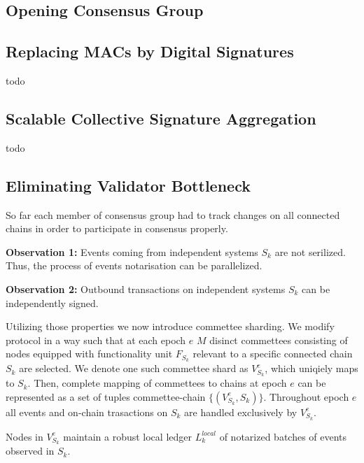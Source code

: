 \subsection{Opening Consensus Group}\label{subsec:opening-consensus-group}


\subsection{Replacing MACs by Digital Signatures}\label{subsec:replacing-macs-by-digital-signatures}

todo

\subsection{Scalable Collective Signature Aggregation}\label{subsec:scalable-collective-signature-aggregation}

todo

\subsection{Eliminating Validator Bottleneck}\label{subsec:eliminating-validator-bottleneck}

So far each member of consensus group had to track changes on all connected chains in order to participate in consensus properly.

\textbf{Observation 1:} Events coming from independent systems $S_k$ are not serilized.
Thus, the process of events notarisation can be parallelized.

\textbf{Observation 2:} Outbound transactions on independent systems $S_k$ can be independently signed.

Utilizing those properties we now introduce commettee sharding.
We modify protocol in a way such that at each epoch $e$ $M$ disinct commettees consisting of nodes equipped with functionality unit $F_{S_k}$ relevant to a specific connected chain $S_k$ are selected.
We denote one such commettee shard as $V^{e}_{S_k}$, which uniqiely maps to $S_k$.
Then, complete mapping of commettees to chains at epoch $e$ can be represented as a set of tuples commettee-chain $\{(V^{e}_{S_k}, S_k)\}$.
Throughout epoch $e$ all events and on-chain trasactions on $S_k$ are handled exclusively by $V^{e}_{S_k}$.

Nodes in $V^{e}_{S_k}$ maintain a robust local ledger $L^{local}_k$ of notarized batches of events observed in $S_k$.

